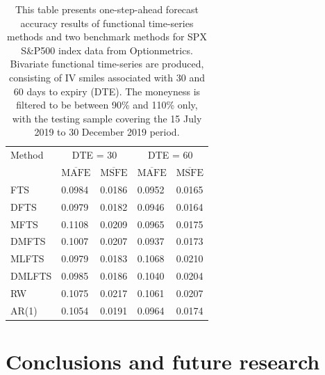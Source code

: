 \documentclass[12pt,a4paper]{article}
\begin{document}
\begin{table}[!htbp]
\tabcolsep 0.3in
\centering
\caption{\small{This table presents one-step-ahead forecast accuracy results of functional time-series methods and two benchmark methods for SPX S\&P500 index data from Optionmetrics. Bivariate functional time-series are produced, consisting of IV smiles associated with 30 and 60 days to expiry (DTE). The moneyness is filtered to be between 90\% and 110\% only, with the testing sample covering the 15 July 2019 to 30 December 2019 period.}}\label{tab:SPX}
\begin{tabular}{@{}lllll@{}}
\toprule
Method & \multicolumn{2}{c}{DTE = 30} & \multicolumn{2}{c}{DTE = 60} \\
& $\overline{\text{MAFE}}$ & $\overline{\text{MSFE}}$ & $\overline{\text{MAFE}}$ & $\overline{\text{MSFE}}$ \\ \midrule
FTS & 0.0984 & 0.0186 & 0.0952 & 0.0165 \\
DFTS & 0.0979 & 0.0182 & 0.0946 & 0.0164 \\
MFTS & 0.1108 & 0.0209 & 0.0965 & 0.0175 \\
DMFTS & 0.1007 & 0.0207 & 0.0937 & 0.0173 \\
MLFTS & 0.0979 & 0.0183 & 0.1068 & 0.0210 \\
DMLFTS & 0.0985 & 0.0186 & 0.1040 & 0.0204 \\
RW & 0.1075 & 0.0217 & 0.1061 & 0.0207 \\
AR(1) & 0.1054 & 0.0191 & 0.0964 & 0.0174 \\
\bottomrule
\end{tabular}
\end{table}


\section{Conclusions and future research}\label{sec:6}
\end{document}
